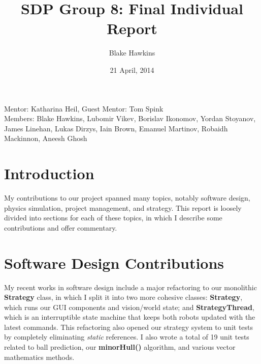 \documentclass[a4paper,11pt]{article}
\title{SDP Group 8: Final Individual Report} %
\author{Blake Hawkins} %
\date{21 April, 2014} %
\begin{document}
\maketitle %

\begin{center}
Mentor: Katharina Heil, Guest Mentor: Tom Spink %
\\
Members: Blake Hawkins, %
Lubomir Vikev,
Borislav Ikonomov,
Yordan Stoyanov,
James Linehan,
Lukas Dirzys,
Iain Brown,
Emanuel Martinov,
Robaidh Mackinnon,
Aneesh Ghosh

\end{center}


\section{Introduction}

My contributions to our project spanned many topics, notably software design, physics simulation, project management, and strategy. This report is loosely divided into sections for each of these topics, in which I describe some contributions and offer commentary.


\section{Software Design Contributions}

My recent works in software design include a major refactoring to our monolithic \textbf{Strategy} class, in which I split it into two more cohesive classes: \textbf{Strategy}, which runs our GUI components and vision/world state; and \textbf{StrategyThread}, which is an interruptible state machine that keeps both robots updated with the latest commands. This refactoring also opened our strategy system to unit tests by completely eliminating \textit{static} references. I also wrote a total of 19 unit tests related to ball prediction, our \textbf{minorHull()} algorithm, and various vector mathematics methods.
\end{document}

